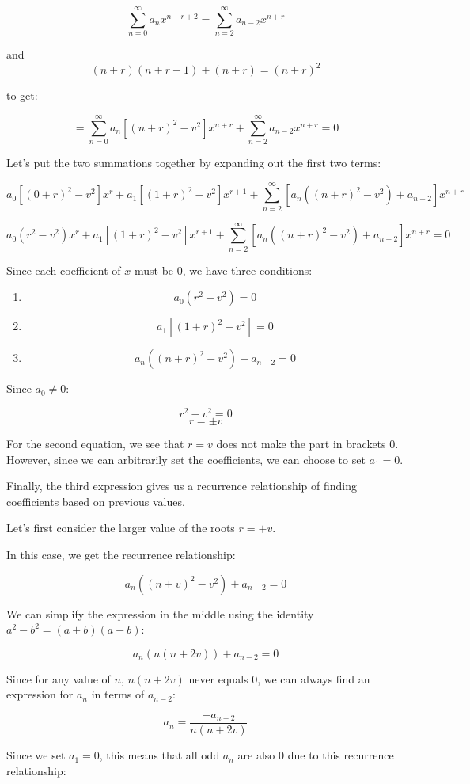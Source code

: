 \documentclass{report}
\begin{document}
{$$\sum_{n=0}^\infty a_nx^{n+r+2} = \sum_{n=2}^\infty a_{n-2}x^{n+r}$$

and 
$$(n+r)(n+r-1) + (n+r) = (n+r)^2$$

to get:

$$
= \sum_{n=0}^\infty a_n[(n+r)^2-v^2]x^{n+r}
+ \sum_{n=2}^\infty a_{n-2}x^{n+r}  = 0
$$

Let's put the two summations together by expanding out the first two terms:

$$a_0[(0+r)^2-v^2]x^r + a_1[(1+r)^2-v^2]x^{r+1}
+ \sum_{n=2}^\infty [a_n((n+r)^2-v^2)+a_{n-2}]x^{n+r}$$

$$\boxed{
a_0(r^2-v^2)x^r + a_1[(1+r)^2-v^2]x^{r+1} +  \sum_{n=2}^\infty [a_n((n+r)^2-v^2)+a_{n-2}]x^{n+r}
=0} $$

Since each coefficient of $x$ must be 0, we have three conditions:

\begin{enumerate}
	\item $$a_0(r^2-v^2) = 0$$
	\item $$a_1[(1+r)^2-v^2] = 0$$
	\item $$a_n((n+r)^2-v^2)+a_{n-2} = 0$$
\end{enumerate}

Since $a_0 \neq 0$:

$$r^2 - v^2 = 0$$
$$\boxed{r = \pm v}$$

For the second equation, we see that $r = v$ does not make the part in brackets 0. However, since we can arbitrarily set the coefficients, we can choose to set $a_1 = 0$.

Finally, the third expression gives us a recurrence relationship of finding coefficients based on previous values.


Let's first consider the larger value of the roots $r= +v$.

In this case, we get the recurrence relationship:

$$a_n((n+v)^2-v^2)+a_{n-2} = 0$$

We can simplify the expression in the middle using the identity $a^2-b^2 = (a+b)(a-b)$:

$$a_n(n(n+2v))+a_{n-2} = 0$$

Since for any value of $n$, $n(n+2v)$ never equals 0, we can always find an expression for $a_n$ in terms of $a_{n-2}$:


$$a_n=\frac{-a_{n-2}}{n(n+2v)}$$

Since we set $a_1 = 0$, this means that all odd $a_n$ are also 0 due to this recurrence relationship:

}
\end{document}
